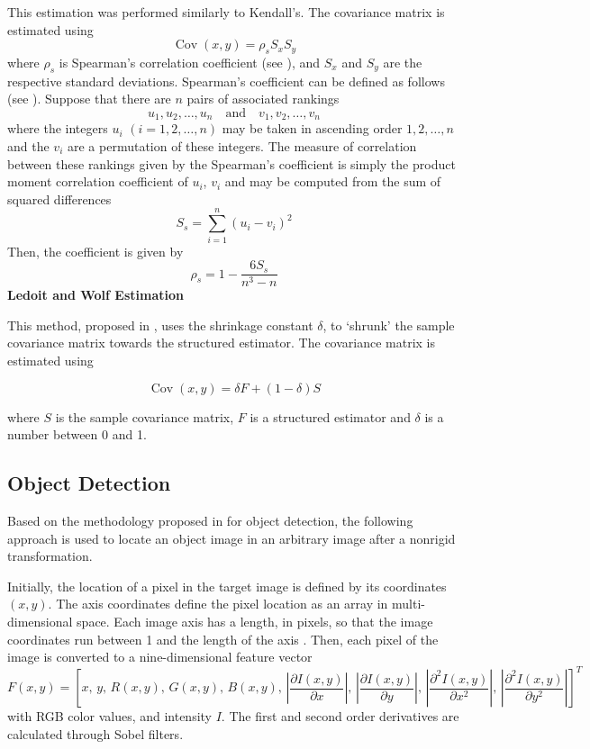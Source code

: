 \documentclass[11pt]{article}
\theoremstyle{definition}
\theoremstyle{remark}
\theoremstyle{remark}
\theoremstyle{remark}
\begin{document}
This estimation was performed similarly to Kendall's. The covariance matrix is estimated using
\[
\operatorname{Cov}(x, y)=\rho_{s} S_{x} S_{y}
\]
where $\rho_{s}$ is Spearman's correlation coefficient (see \parencite{spearman1961general}), and $S_{x}$ and $S_{y}$ are the respective standard deviations. Spearman's coefficient can be defined as follows (see \cite{spearmscoeff}). Suppose that there are $n$ pairs of associated rankings
\[
u_{1}, u_{2}, \ldots, u_{n} \quad \text{and} \quad v_{1}, v_{2}, \ldots, v_{n} 
\]
where the integers $u_{i}$ $(i = 1,2,\ldots,n)$ may be taken in ascending order $1,2,\ldots,n$ and the $v_{i}$ are a permutation of these integers. The measure of correlation between these rankings given by the Spearman's coefficient is simply the product moment correlation coefficient of $u_{i}$, $v_{i}$ and may be computed from the sum of squared differences
\[
S_{s} = \sum_{i = 1}^{n} (u_{i} - v_{i})^{2} 
\]
Then, the coefficient is given by
\[
\rho_{s} = 1 - \dfrac{6S_{s}}{n^{3} - n}
\]
\textbf{Ledoit and Wolf Estimation}

This method, proposed in \parencite{ledoit2004honey}, uses the shrinkage constant $\delta$, to ‘shrunk’ the sample covariance matrix towards the structured estimator. The covariance matrix is estimated using

\[
\operatorname{Cov}(x, y)={\delta} F+\left(1-{\delta}\right)S
\]

where $S$ is the sample covariance matrix, $F$ is a structured estimator and $\delta$ is a number between 0 and 1. 


\subsection{Object Detection}
Based on the methodology proposed in \parencite{tuzel2006} for object detection, the following approach is used to locate an object image in an arbitrary image after a nonrigid transformation.

Initially, the location of a pixel in the target image is defined by its coordinates $(x,y)$. The axis coordinates define the pixel location as an array in multi-dimensional space. Each image axis has a length, in pixels, so that the image coordinates run between 1 and the length of the axis \parencite{mikhail1984detection}. Then, each pixel of the image is converted to a nine-dimensional feature vector
%
\begin{equation}
F(x, y)=\left[x,\, y,\, R(x, y),\, G(x, y),\, B(x, y),\,\left|\frac{\partial I(x, y)}{\partial x}\right|,\,\left|\frac{\partial I(x, y)}{\partial y}\right|,\,\left|\frac{\partial^{2} I(x, y)}{\partial x^{2}}\right|,\,\left|\frac{\partial^{2} I(x, y)}{\partial y^{2}}\right|\right]^{T}
\end{equation}
%
with RGB color values, and intensity $I$. The first and second order derivatives are calculated through Sobel filters.
\end{document}
